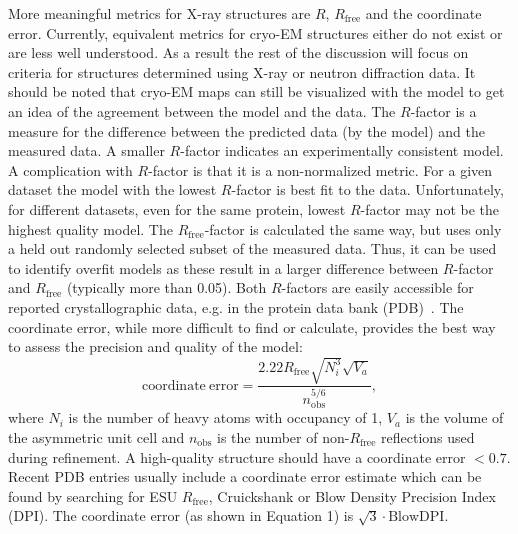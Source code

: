 \documentclass[9pt,bestpractices]{livecoms}
\begin{document}
More meaningful metrics for X-ray structures are $R$, $R_{\mathrm{free}}$ and the coordinate error. Currently, equivalent metrics for cryo-EM structures either do not exist or are less well understood.  As a result the rest of the discussion will focus on criteria for structures determined using X-ray or neutron diffraction data.  It should be noted that cryo-EM maps can still be visualized with the model to get an idea of the agreement between the model and the data.
%
The $R$-factor is a measure for the difference between the predicted data (by the model) and the measured data. A smaller $R$-factor indicates an experimentally consistent model. A complication with $R$-factor is that it is a non-normalized metric. For a given dataset the model with the lowest $R$-factor is best fit to the data.  Unfortunately, for different datasets, even for the same protein, lowest $R$-factor may not be the highest quality model. 
%
The $R_{\mathrm{free}}$-factor is calculated the same way, but uses only a held out randomly selected subset of the measured data. Thus, it can be used to identify overfit models as these result in a larger difference between $R$-factor and $R_{\mathrm{free}}$ (typically more than 0.05).
Both $R$-factors are easily accessible for reported crystallographic data, e.g. in the protein data bank (PDB)~\cite{bermanProteinDataBank2000}. 
%
The coordinate error, while more difficult to find or calculate, provides the best way to assess the precision and quality of the model:
%
\begin{equation}
    \mathrm{coordinate\ error} = \frac{2.22 R_{\mathrm{free}}\sqrt{N_i^3}\sqrt{V_a}} {n_{\mathrm{obs}}^{5/6}},
    \label{eq:coordinate_error}
\end{equation}
%
where $N_i$ is the number of heavy atoms with occupancy of 1, $V_a$ is the volume of the asymmetric unit cell and $n_{\mathrm{obs}}$ is the number of non-$R_{\mathrm{free}}$ reflections used during refinement. A high-quality structure should have a coordinate error $<0.7$. Recent PDB entries usually include a coordinate error estimate which can be found by searching for ESU $R_{\mathrm{free}}$, Cruickshank or Blow Density Precision Index (DPI). The coordinate error (as shown in Equation 1) is $\sqrt{3}\cdot \mathrm{BlowDPI}$. 
\end{document}
